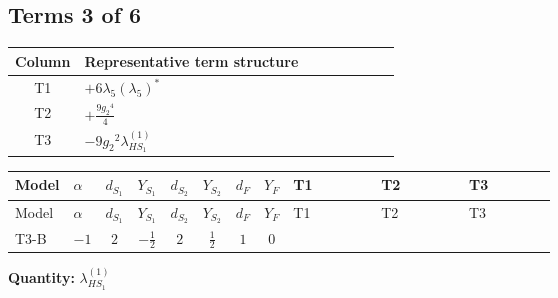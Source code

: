 \documentclass[8pt]{article}
\begin{document}
\begin{landscape}
\subsection*{Terms 3 of 6}
\begin{center}
\begin{tabular}{@{}c >{\raggedright\arraybackslash}p{0.82\linewidth}@{}}
\toprule
Column & Representative term structure \\
\midrule
T1 & \(\displaystyle +6 {\lambda_5} \left({\lambda_5}\right)^{*}\) \\
\midrule
T2 & \(\displaystyle +\frac{9 {g_2}^4}{4}\) \\
\midrule
T3 & \(\displaystyle -9 {g_2}^2 {\lambda_{HS_1}^{(1)}}\) \\
\midrule
\bottomrule
\end{tabular}
\end{center}
\smallskip
\tiny
\begin{longtable}{@{}llcccccc >{\raggedright\arraybackslash}p{0.21\linewidth} >{\raggedright\arraybackslash}p{0.21\linewidth} >{\raggedright\arraybackslash}p{0.21\linewidth}@{}}
\toprule
Model & $\alpha$ & $d_{S_1}$ & $Y_{S_1}$ & $d_{S_2}$ & $Y_{S_2}$ & $d_F$ & $Y_F$ & T1 & T2 & T3 \\
\midrule
\endfirsthead
\toprule
Model & $\alpha$ & $d_{S_1}$ & $Y_{S_1}$ & $d_{S_2}$ & $Y_{S_2}$ & $d_F$ & $Y_F$ & T1 & T2 & T3 \\
\midrule
\endhead
T3-B & $-1$ & $2$ & $-\frac{1}{2}$ & $2$ & $\frac{1}{2}$ & $1$ & $0$ & \scriptsize\adjustbox{max width=\linewidth}{$\begin{gathered} +6 {\lambda_5} \left({\lambda_5}\right)^{*}\end{gathered}$} & \scriptsize\adjustbox{max width=\linewidth}{$\begin{gathered} +\frac{9 {g_2}^4}{4}\end{gathered}$} & \scriptsize\adjustbox{max width=\linewidth}{$\begin{gathered} -9 {g_2}^2 {\lambda_{HS_1}^{(1)}}\end{gathered}$} \\
\midrule
\bottomrule
\end{longtable}
\clearpage
\noindent\textbf{Quantity: }$\lambda_{HS_1}^{(1)}$\par\smallskip

\end{landscape}
\end{document}
